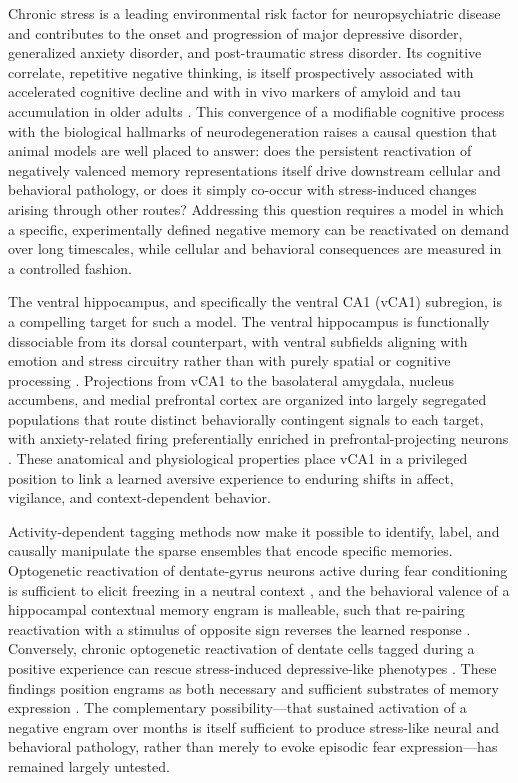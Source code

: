 \documentclass[11pt]{article}
\begin{document}
Chronic stress is a leading environmental risk factor for neuropsychiatric disease and contributes to the onset and progression of major depressive disorder, generalized anxiety disorder, and post-traumatic stress disorder. Its cognitive correlate, repetitive negative thinking, is itself prospectively associated with accelerated cognitive decline and with in vivo markers of amyloid and tau accumulation in older adults \citep{marchant2020rnt}. This convergence of a modifiable cognitive process with the biological hallmarks of neurodegeneration raises a causal question that animal models are well placed to answer: does the persistent reactivation of negatively valenced memory representations itself drive downstream cellular and behavioral pathology, or does it simply co-occur with stress-induced changes arising through other routes? Addressing this question requires a model in which a specific, experimentally defined negative memory can be reactivated on demand over long timescales, while cellular and behavioral consequences are measured in a controlled fashion.

The ventral hippocampus, and specifically the ventral CA1 (vCA1) subregion, is a compelling target for such a model. The ventral hippocampus is functionally dissociable from its dorsal counterpart, with ventral subfields aligning with emotion and stress circuitry rather than with purely spatial or cognitive processing \citep{fanselow2010ventral}. Projections from vCA1 to the basolateral amygdala, nucleus accumbens, and medial prefrontal cortex are organized into largely segregated populations that route distinct behaviorally contingent signals to each target, with anxiety-related firing preferentially enriched in prefrontal-projecting neurons \citep{ciocchi2015vca1}. These anatomical and physiological properties place vCA1 in a privileged position to link a learned aversive experience to enduring shifts in affect, vigilance, and context-dependent behavior.

Activity-dependent tagging methods now make it possible to identify, label, and causally manipulate the sparse ensembles that encode specific memories. Optogenetic reactivation of dentate-gyrus neurons active during fear conditioning is sufficient to elicit freezing in a neutral context \citep{liu2012engram}, and the behavioral valence of a hippocampal contextual memory engram is malleable, such that re-pairing reactivation with a stimulus of opposite sign reverses the learned response \citep{redondo2014valence}. Conversely, chronic optogenetic reactivation of dentate cells tagged during a positive experience can rescue stress-induced depressive-like phenotypes \citep{ramirez2015positive}. These findings position engrams as both necessary and sufficient substrates of memory expression \citep{josselyn2020engram}. The complementary possibility---that sustained activation of a negative engram over months is itself sufficient to produce stress-like neural and behavioral pathology, rather than merely to evoke episodic fear expression---has remained largely untested.
\end{document}
